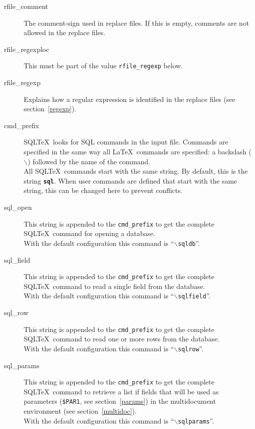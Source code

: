\documentclass{article}
\newcommand{\bs}{\ensuremath{\backslash}}
\begin{document}
\begin{description}
\item[rfile\_comment] The comment-sign used in replace files. If this is empty, comments are not allowed in
the replace files.

\item[rfile\_regexploc] This must be part of the value \texttt{rfile\_regexp} below. 

\item[rfile\_regexp] Explains how a regular expression is identified in the replace files (see section~\ref{regexp}). 

\item[cmd\_prefix]\label{prefix} SQL\TeX\ looks for SQL commands in the input file. Commands are specified in the
same way all \LaTeX\ commands are specified: a backslash (\bs) followed by the
name of the command.\\
All SQL\TeX\ commands start with the same string. By default, this is the string
\texttt{\textbf{sql}}. When user commands are defined that start with the same
string, this can be changed here to prevent conflicts.

\item[sql\_open] This string is appended to the \texttt{cmd\_prefix} to
get the complete SQL\TeX\ command for opening a database.\\
With the default configuration this command is ``\texttt{\bs sqldb}''.

\item[sql\_field] This string is appended to the \texttt{cmd\_prefix} to
get the complete SQL\TeX\ command to read a single field from the database.\\
With the default configuration this command is ``\texttt{\bs sqlfield}''.

\item[sql\_row] This string is appended to the \texttt{cmd\_prefix} to
get the complete SQL\TeX\ command to read one or more rows from the database.\\
With the default configuration this command is ``\texttt{\bs sqlrow}''.

\item[sql\_params] This string is appended to the \texttt{cmd\_prefix} to get the complete SQL\TeX\ command to retrieve a list if fields that will be used as parameters (\texttt{\$PAR1}, see section~\ref{params}) in the multidocument environment (see section~\ref{multidoc}).\\
With the default configuration this command is ``\texttt{\bs sqlparams}''.


\end{description}
\end{document}
